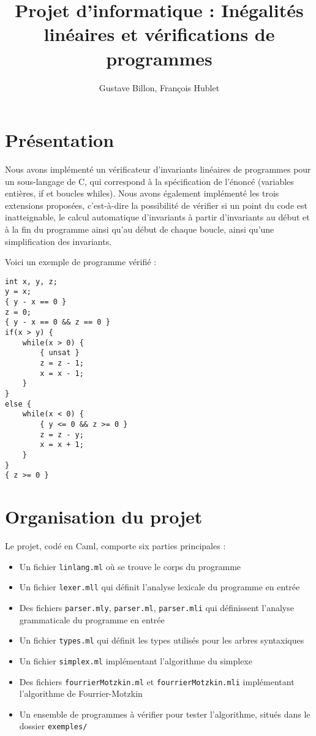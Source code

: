 \documentclass[a4paper]{article}
\title{Projet d'informatique : Inégalités linéaires et vérifications de programmes}
\author{Gustave Billon, François Hublet}
\begin{document}
\maketitle


\section{Présentation}

Nous avons implémenté un vérificateur d'invariants linéaires de programmes pour un sous-langage de C, qui correspond à la spécification de l'énoncé (variables entières, if et boucles whiles). Nous avons également implémenté les trois extensions proposées, c'est-à-dire la possibilité de vérifier si un point du code est inatteignable, le calcul automatique d'invariants à partir d'invariants au début et à la fin du programme ainsi qu'au début de chaque boucle, ainsi qu'une simplification des invariants.

Voici un exemple de programme vérifié :

\begin{lstlisting}
int x, y, z;
y = x;
{ y - x == 0 }
z = 0;
{ y - x == 0 && z == 0 }
if(x > y) {
	while(x > 0) {
		{ unsat }
		z = z - 1;
		x = x - 1;
	}
}
else {
	while(x < 0) {
		{ y <= 0 && z >= 0 }
		z = z - y;
		x = x + 1;
	}
}
{ z >= 0 }
\end{lstlisting}

\section{Organisation du projet}

Le projet, codé en Caml, comporte six parties principales :

\begin{itemize}
  \item Un fichier \texttt{linlang.ml} où se trouve le corps du programme
  \item Un fichier \texttt{lexer.mll} qui définit l'analyse lexicale du programme en entrée
  \item Des fichiers \texttt{parser.mly}, \texttt{parser.ml}, \texttt{parser.mli} qui définissent l'analyse grammaticale du programme en entrée
  \item Un fichier \texttt{types.ml} qui définit les types utilisés pour les arbres syntaxiques
  \item Un fichier \texttt{simplex.ml} implémentant l'algorithme du simplexe
  \item Des fichiers \texttt{fourrierMotzkin.ml} et \texttt{fourrierMotzkin.mli} implémentant l'algorithme de Fourrier-Motzkin
  \item Un ensemble de programmes à vérifier pour tester l'algorithme, situés dans le dossier \texttt{exemples/}

\end{itemize}
\end{document}
